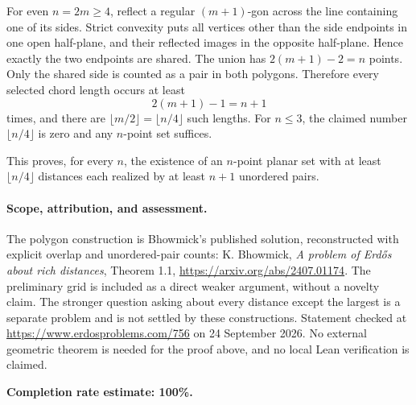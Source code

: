 For even \(n=2m\geq4\), reflect a regular \((m+1)\)-gon across the line containing one of its sides. Strict convexity puts all vertices other than the side endpoints in one open half-plane, and their reflected images in the opposite half-plane. Hence exactly the two endpoints are shared. The union has \(2(m+1)-2=n\) points. Only the shared side is counted as a pair in both polygons. Therefore every selected chord length occurs at least
\[
 2(m+1)-1=n+1
\]
times, and there are \(\lfloor m/2\rfloor=\lfloor n/4\rfloor\) such lengths. For \(n\leq3\), the claimed number \(\lfloor n/4\rfloor\) is zero and any \(n\)-point set suffices.

This proves, for every \(n\), the existence of an \(n\)-point planar set with at least \(\lfloor n/4\rfloor\) distances each realized by at least \(n+1\) unordered pairs.

\paragraph{Scope, attribution, and assessment.}
The polygon construction is Bhowmick's published solution, reconstructed with explicit overlap and unordered-pair counts: K. Bhowmick, \emph{A problem of Erd\H{o}s about rich distances}, Theorem 1.1, \url{https://arxiv.org/abs/2407.01174}. The preliminary grid is included as a direct weaker argument, without a novelty claim. The stronger question asking about every distance except the largest is a separate problem and is not settled by these constructions. Statement checked at \url{https://www.erdosproblems.com/756} on 24 September 2026. No external geometric theorem is needed for the proof above, and no local Lean verification is claimed.

\textbf{Completion rate estimate: 100\%.}
